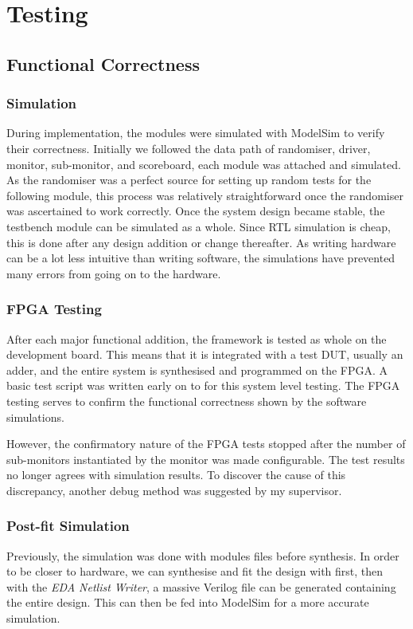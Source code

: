 \chapter{Testing}

\section{Functional Correctness}
\subsection{Simulation}
During implementation, the modules were simulated with ModelSim to verify their correctness.
Initially we followed the data path of randomiser, driver, monitor, sub-monitor, and scoreboard, each module was attached and simulated.
As the randomiser was a perfect source for setting up random tests for the following module, this process was relatively straightforward once the randomiser was ascertained to work correctly.
Once the system design became stable, the testbench module can be simulated as a whole.
Since RTL simulation is cheap, this is done after any design addition or change thereafter.
As writing hardware can be a lot less intuitive than writing software, the simulations have prevented many errors from going on to the hardware.

\subsection{FPGA Testing}
After each major functional addition, the framework is tested as whole on the development board.
This means that it is integrated with a test DUT, usually an adder, and the entire system is synthesised and programmed on the FPGA.
A basic test script was written early on to for this system level testing.
The FPGA testing serves to confirm the functional correctness shown by the software simulations.

However, the confirmatory nature of the FPGA tests stopped after the number of sub-monitors instantiated by the monitor was made configurable.
The test results no longer agrees with simulation results.
To discover the cause of this discrepancy, another debug method was suggested by my supervisor.

\subsection{Post-fit Simulation}
Previously, the simulation was done with modules files before synthesis.
In order to be closer to hardware, we can synthesise and fit the design with first, then with the \textit{EDA Netlist Writer}, a massive Verilog file can be generated containing the entire design.
This can then be fed into ModelSim for a more accurate simulation.

